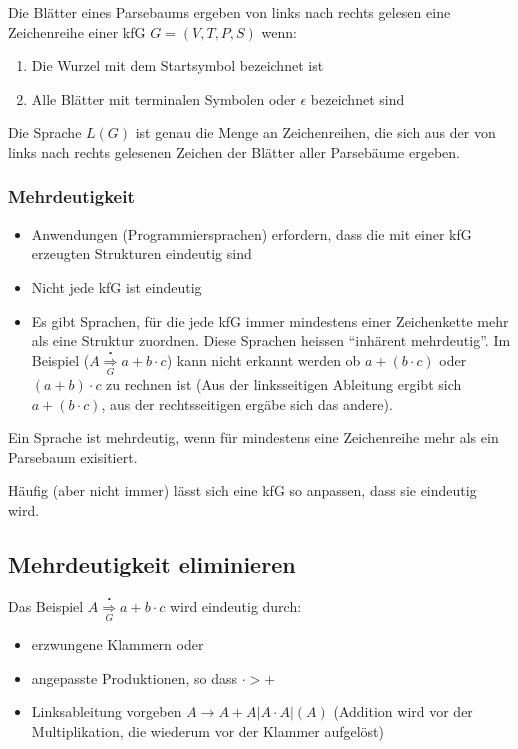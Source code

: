Die Blätter eines Parsebaums ergeben von links nach rechts gelesen eine
Zeichenreihe einer kfG $G = (V, T, P, S)$ wenn:
\begin{enumerate}\itemsep0em
	\item Die Wurzel mit dem Startsymbol bezeichnet ist
	\item Alle Blätter mit terminalen Symbolen oder $\epsilon$ bezeichnet sind
\end{enumerate}
Die Sprache $L(G)$ ist genau die Menge an Zeichenreihen, die sich aus der
von links nach rechts gelesenen Zeichen der Blätter aller Parsebäume ergeben.

\subsubsection{Mehrdeutigkeit}
\begin{itemize}\itemsep0em
	\item Anwendungen (Programmiersprachen) erfordern, dass die mit einer kfG erzeugten Strukturen eindeutig sind
	\item Nicht jede kfG ist eindeutig
	\item Es gibt Sprachen, für die jede kfG immer mindestens
	einer Zeichenkette mehr als eine Struktur zuordnen. Diese Sprachen heissen
	\enquote{inhärent mehrdeutig}. Im Beispiel ($A \overset{\centerdot}{\underset{G}{\Rightarrow}} a + b \cdot c$) kann nicht erkannt werden ob
	$a + (b \cdot c)$ oder $(a + b) \cdot c$ zu rechnen ist (Aus der linksseitigen Ableitung ergibt sich $a + (b \cdot c) $, aus der rechtsseitigen ergäbe sich das andere).
\end{itemize}
Ein Sprache ist mehrdeutig, wenn für mindestens eine Zeichenreihe mehr als ein Parsebaum exisitiert.

Häufig (aber nicht immer) lässt sich eine kfG so anpassen, dass sie eindeutig wird.

\subsection{Mehrdeutigkeit eliminieren}
Das Beispiel $A \overset{\centerdot}{\underset{G}{\Rightarrow}} a + b \cdot c$ wird eindeutig durch:
\begin{itemize}\itemsep0em
	\item erzwungene Klammern oder
	\item angepasste Produktionen, so dass $\cdot > +$
	\item Linksableitung vorgeben $A \rightarrow A + A | A \cdot A | (A)$ (Addition wird vor der Multiplikation, die wiederum vor der Klammer aufgelöst)
\end{itemize}

